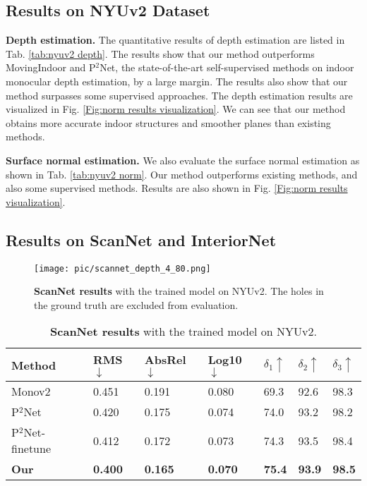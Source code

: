 \documentclass[10pt,twocolumn,letterpaper]{article}
\newcommand{\Fig}[1]{Fig. \ref{#1}}
\newcommand{\Tab}[1]{Tab. \ref{#1}}
\begin{document}
\subsection{Results on NYUv2 Dataset}
\textbf{Depth estimation.} The quantitative results of depth estimation are listed in \Tab{tab:nyuv2 depth}. The results show that our method outperforms MovingIndoor\cite{zhou2019moving} and P$^{2}$Net\cite{yu2020p}, the state-of-the-art self-supervised methods on indoor monocular depth estimation, by a large margin. The results also show that our method surpasses some supervised approaches. The depth estimation results are visualized in \Fig{Fig:norm results visualization}. We can see that our method obtains more accurate indoor structures and smoother planes than existing methods.

\textbf{Surface normal estimation.} We also evaluate the surface normal estimation as shown in \Tab{tab:nyuv2 norm}. Our method  outperforms existing methods, and also some supervised methods\cite{fouhey2013data,qi2018geonet,fu2018deep}. Results are also shown in \Fig{Fig:norm results visualization}.	

\subsection{Results on ScanNet and InteriorNet}


\begin{figure}[ht]
	\centering
	\texttt{[image: pic/scannet\_depth\_4\_80.png]} \caption{\textbf{ScanNet results} with the trained model on NYUv2. The holes in the ground truth are excluded from evaluation.} \label{Fig:scannet depth}
\end{figure}
\begin{table}[h]
	\scriptsize                                                                                    
\centering
	\begin{tabularx}{0.48\textwidth}{|l|XXX|XXX|}
		\hline
		Method & RMS$\downarrow$ & AbsRel$\downarrow$ & Log10$\downarrow$ & $\delta_{1}\uparrow$ & $\delta_{2}\uparrow$ & $\delta_{3}\uparrow$ \\
		\hline
		Monov2\cite{godard2019digging} & 0.451 & 0.191   & 0.080 & 69.3  & 92.6  & 98.3 \\
		
		P$^2$Net \cite{yu2020p} & 0.420  & 0.175 & 0.074 & 74.0    & 93.2  & 98.2 \\
		
		P$^2$Net-finetune & 0.412  & 0.172 & 0.073 & 74.3    & 93.5  & 98.4 \\
		
\textbf{Our}   & \textbf{0.400} & \textbf{0.165} & \textbf{0.070} & \textbf{75.4}  & \textbf{93.9}  & \textbf{98.5} \\
		\hline
	\end{tabularx}\newline
	\caption{\textbf{ScanNet results} with the trained model on NYUv2.}
	\label{tab:scannet}
\end{table}
\end{document}
